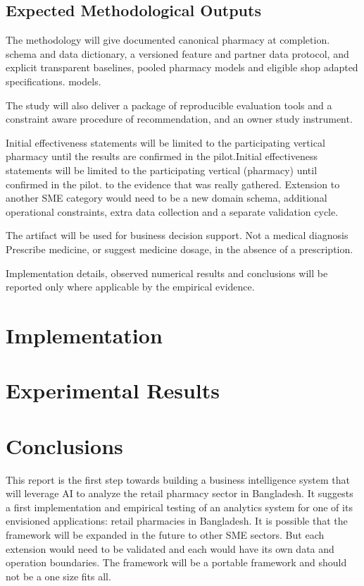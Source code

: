 \documentclass[a4paper,11pt,oneside]{book}
\makeatletter
\def\cleardoublepage{\clearpage\if@twoside \ifodd\c@page\else
\hbox{}
\thispagestyle{empty}
\newpage
\if@twocolumn\hbox{}\newpage\fi\fi\fi}
\theoremstyle{plain}
\theoremstyle{definition}
\theoremstyle{remark}
\makeatother
\begin{document}
\section{Expected Methodological Outputs}
\label{sec:expected_methodological_outputs}

The methodology will give documented canonical pharmacy at completion. schema and data dictionary, a versioned feature and partner data protocol, and explicit transparent baselines, pooled pharmacy models and eligible shop adapted specifications. models.

The study will also deliver a package of reproducible evaluation tools and a constraint aware procedure of recommendation, and an owner study instrument.

Initial effectiveness statements will be limited to the participating vertical pharmacy until the results are confirmed in the pilot.Initial effectiveness statements will be limited to the participating vertical (pharmacy) until confirmed in the pilot. to the evidence that was really gathered. Extension to another SME category would need to be a new domain schema, additional operational constraints, extra data collection and a separate validation cycle.

The artifact will be used for business decision support. Not a medical diagnosis Prescribe medicine, or suggest medicine dosage, in the absence of a prescription.

Implementation details, observed numerical results and conclusions will be reported only where applicable by the empirical evidence.

\clearpage

\chapter{Implementation}
\label{chapter_implementation}


\cleardoublepage
\chapter{Experimental Results}
\label{chapter_experimentalResults}


\cleardoublepage
\chapter{Conclusions}
\label{chapter_conclusion}
This report is the first step towards building a business intelligence system that will leverage AI to analyze the retail pharmacy sector in Bangladesh. It suggests a first implementation and empirical testing of an analytics system for one of its envisioned applications: retail pharmacies in Bangladesh. It is possible that the framework will be expanded in the future to other SME sectors. But each extension would need to be validated and each would have its own data and operation boundaries. The framework will be a portable framework and should not be a one size fits all.
\end{document}
